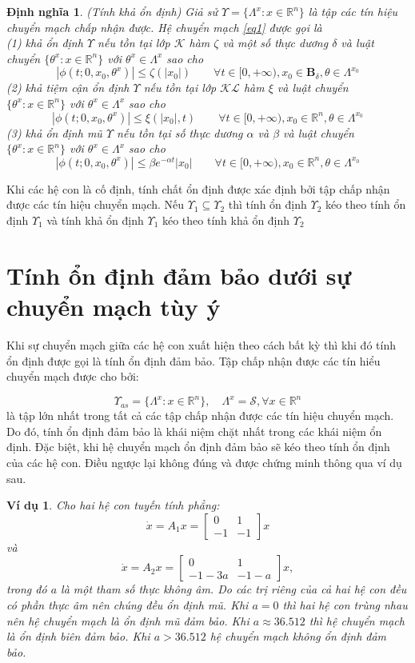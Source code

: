 \documentclass[14pt,a4paper,oneside]{report}		%
\newtheorem{define}[theorem]{Định nghĩa}
\newtheorem{example}[theorem]{Ví dụ}
\begin{document}
\begin{define} (Tính khả ổn định) Giả sử $\Upsilon = \{\Lambda^x:x\in\mathbb{R}^n\}$ là tập các tín hiệu chuyển mạch chấp nhận được. Hệ chuyển mạch \ref{eq1} được gọi là \\
(1) khả ổn định $\Upsilon$ nếu tồn tại lớp $\mathcal{K}$ hàm $\zeta$ và một số thực dương $\delta$ và luật chuyển $\{\theta^x:x\in\mathbb{R}^n\}$ với $\theta^x\in\Lambda^x$ sao cho
$$|\phi(t;0,x_0,\theta^x)|\leq\zeta(|x_0|)\qquad\forall t \in [0,+\infty ), x_0 \in\mathbf{B}_\delta , \theta \in\Lambda^{x_0}$$
(2) khả tiệm cận ổn định $\Upsilon$ nếu tồn tại lớp $\mathcal{KL}$ hàm $\xi$ và luật chuyển $\{\theta^x:x\in\mathbb{R}^n\}$ với $\theta^x\in\Lambda^x$ sao cho
$$|\phi(t;0,x_0,\theta^x)|\leq\xi(|x_0|,t)\qquad\forall t \in [0,+\infty ), x_0 \in\mathbb{R}^n , \theta \in\Lambda^{x_0}$$
(3) khả ổn định mũ $\Upsilon$ nếu tồn tại số thực dương $\alpha$ và $\beta$ và luật chuyển $\{\theta^x:x\in\mathbb{R}^n\}$ với $\theta^x\in\Lambda^x$ sao cho
$$|\phi(t;0,x_0,\theta^x)|\leq \beta e^{-\alpha t}|x_0|\qquad\forall t \in [0,+\infty ), x_0 \in\mathbb{R}^n , \theta \in\Lambda^{x_0}$$
\end{define}

Khi các hệ con là cố định, tính chất ổn định được xác định bởi tập chấp nhận được các tín hiệu chuyển mạch. Nếu $\Upsilon_1\subseteq\Upsilon_2$ thì tính ổn định $\Upsilon_2$ kéo theo tính ổn định $\Upsilon_1$ và tính khả ổn định $\Upsilon_1$ kéo theo tính khả ổn định $\Upsilon_2$

\section{Tính ổn định đảm bảo dưới sự chuyển mạch tùy ý}
Khi sự chuyển mạch giữa các hệ con xuất hiện theo cách bất kỳ thì khi đó tính ổn định được gọi là tính ổn định đảm bảo. Tập chấp nhận được các tín hiểu chuyển mạch được cho bởi:

$$\Upsilon_{as}=\{\Lambda^x:x\in\mathbb{R}^n\},\quad \Lambda^x=\mathcal{S},\forall x\in\mathbb{R}^n$$
là tập lớn nhất trong tất cả các tập chấp nhận được các tín hiệu chuyển mạch. Do đó, tính ổn định đảm bảo là khái niệm chặt nhất trong các khái niệm ổn định. Đặc biệt, khi hệ chuyển mạch ổn định đảm bảo sẽ kéo theo tính ổn định của các hệ con. Điều ngược lại không đúng và được chứng minh thông qua ví dụ sau.\\
\begin{example}
Cho hai hệ con tuyến tính phẳng:
$$\dot{x}=A_1x=
\begin{bmatrix}
0 & 1\\
-1 & -1
\end{bmatrix}x$$
và
$$\dot{x}=A_2x=
\begin{bmatrix}
0 & 1\\
-1-3a & -1-a
\end{bmatrix}x,$$
trong đó $a$ là một tham số thực không âm. Do các trị riêng của cả hai hệ con đều có phần thực âm nên chúng đều ổn định mũ. Khi $a=0$ thì hai hệ con trùng nhau nên hệ chuyển mạch là ổn định mũ đảm bảo. Khi $a\approx 36.512$ thì hệ chuyển mạch là ổn định biên đảm bảo. Khi $a>36.512$ hệ chuyển mạch không ổn định đảm bảo.
\end{example}
\end{document}
